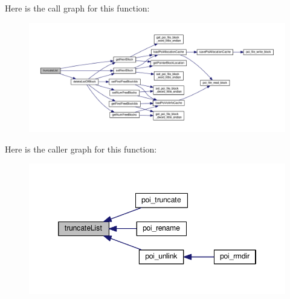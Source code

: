 Here is the call graph for this function\-:\nopagebreak
\begin{figure}[H]
\begin{center}
\leavevmode
\includegraphics[width=350pt]{allocation-table_8h_a986965542b07562f2f205f9d68043a9c_cgraph}
\end{center}
\end{figure}




Here is the caller graph for this function\-:\nopagebreak
\begin{figure}[H]
\begin{center}
\leavevmode
\includegraphics[width=346pt]{allocation-table_8h_a986965542b07562f2f205f9d68043a9c_icgraph}
\end{center}
\end{figure}


